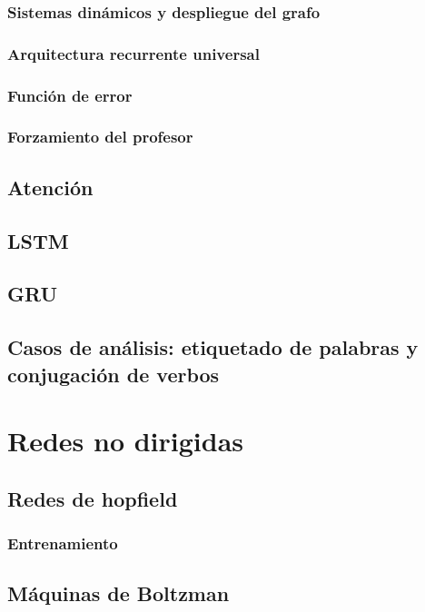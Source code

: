 \documentclass[12pt,openany]{book}
\begin{document}
\section{Sistemas dinámicos y despliegue del grafo}
\section{Arquitectura recurrente universal}
\section{Función de error}
\section{Forzamiento del profesor}

\chapter{Atención}
\chapter{LSTM}
\chapter{GRU}
\chapter{Casos de análisis: etiquetado de palabras y conjugación de verbos}

\part{Redes no dirigidas}
\chapter{Redes de hopfield}
\section{Entrenamiento}

\chapter{Máquinas de Boltzman}
\end{document}
